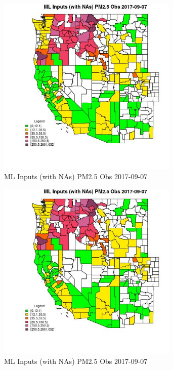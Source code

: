 \begin{figure} 
\centering  
\includegraphics[width=0.77\textwidth]{Code_Outputs/Report_ML_input_PM25_Step4_part_e_de_duplicated_aves_compiled_2019-05-20wNAs_CountyPM25_ObsMean2017-09-07.jpg} 
\caption{\label{fig:Report_ML_input_PM25_Step4_part_e_de_duplicated_aves_compiled_2019-05-20wNAsCountyPM25_ObsMean2017-09-07}ML Inputs (with NAs) PM2.5 Obs 2017-09-07} 
\end{figure} 
 

\begin{figure} 
\centering  
\includegraphics[width=0.77\textwidth]{Code_Outputs/Report_ML_input_PM25_Step4_part_e_de_duplicated_aves_compiled_2019-05-20wNAs_CountyPM25_ObsMean2017-09-07.jpg} 
\caption{\label{fig:Report_ML_input_PM25_Step4_part_e_de_duplicated_aves_compiled_2019-05-20wNAsCountyPM25_ObsMean2017-09-07}ML Inputs (with NAs) PM2.5 Obs 2017-09-07} 
\end{figure} 
 

